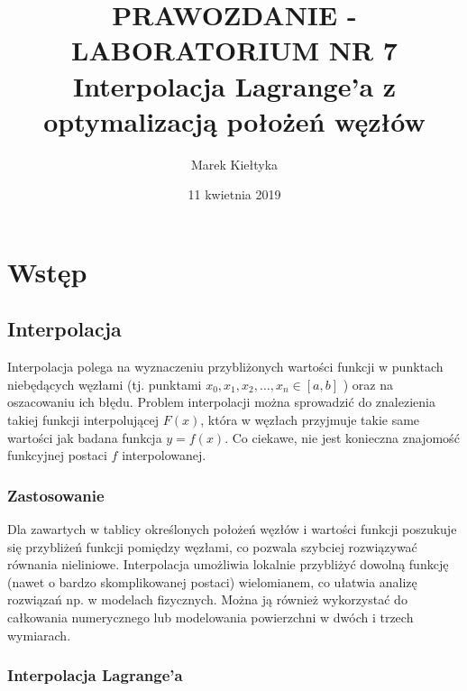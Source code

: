 

\renewcommand{\arraystretch}{1.2}

\title{\Large\vspace{-2.5cm}{\Huge S}PRAWOZDANIE - LABORATORIUM NR {\Huge7}\\
	\textbf{Interpolacja Lagrange'a z optymalizacją położeń węzłów} } 
\date{\Large11 kwietnia 2019}
\author{\Large Marek Kiełtyka}


\maketitle
	
\vspace{-1.2cm}\section{Wstęp}
	
\subsection{Interpolacja}

Interpolacja polega na wyznaczeniu przybliżonych wartości funkcji w punktach niebędących węzłami (tj. punktami $ x_0,x_1,x_2,\dots,x_n \in [a,b] $ ) oraz na oszacowaniu ich błędu. Problem interpolacji można sprowadzić do znalezienia takiej funkcji interpolującej $F(x)$, która w węzłach przyjmuje takie same wartości jak badana funkcja $ y = f(x) $. Co ciekawe, nie jest konieczna znajomość funkcyjnej postaci $ f $ interpolowanej.

\subsubsection{Zastosowanie}

Dla zawartych w tablicy określonych położeń węzłów i wartości funkcji poszukuje się przybliżeń funkcji pomiędzy węzłami, co pozwala szybciej rozwiązywać równania nieliniowe. Interpolacja umożliwia lokalnie przybliżyć dowolną funkcję (nawet o bardzo skomplikowanej postaci) wielomianem, co ułatwia analizę rozwiązań np. w modelach fizycznych. Można ją również wykorzystać do całkowania numerycznego lub modelowania powierzchni w dwóch i trzech wymiarach.
\subsubsection{Interpolacja Lagrange'a}

